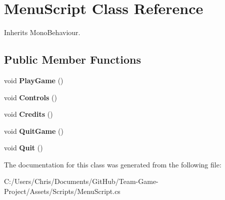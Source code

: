 \hypertarget{class_menu_script}{}\section{Menu\+Script Class Reference}
\label{class_menu_script}


Inherits Mono\+Behaviour.

\subsection*{Public Member Functions}
\begin{DoxyCompactItemize}
\item 
void {\bfseries Play\+Game} ()\hypertarget{class_menu_script_a585fc17a08729e2c324d800ff30147c5}{}\label{class_menu_script_a585fc17a08729e2c324d800ff30147c5}

\item 
void {\bfseries Controls} ()\hypertarget{class_menu_script_a6f6e3a38420fd0f3c56b20786b40554e}{}\label{class_menu_script_a6f6e3a38420fd0f3c56b20786b40554e}

\item 
void {\bfseries Credits} ()\hypertarget{class_menu_script_add5901d5a850a02a2319abc39d88129b}{}\label{class_menu_script_add5901d5a850a02a2319abc39d88129b}

\item 
void {\bfseries Quit\+Game} ()\hypertarget{class_menu_script_adeb18966f4fc959df8a10c0cdacff6cf}{}\label{class_menu_script_adeb18966f4fc959df8a10c0cdacff6cf}

\item 
void {\bfseries Quit} ()\hypertarget{class_menu_script_aa4928a7f9ae663832e3a8ed4af5f0c9e}{}\label{class_menu_script_aa4928a7f9ae663832e3a8ed4af5f0c9e}

\end{DoxyCompactItemize}


The documentation for this class was generated from the following file\+:\begin{DoxyCompactItemize}
\item 
C\+:/\+Users/\+Chris/\+Documents/\+Git\+Hub/\+Team-\/\+Game-\/\+Project/\+Assets/\+Scripts/Menu\+Script.\+cs\end{DoxyCompactItemize}
